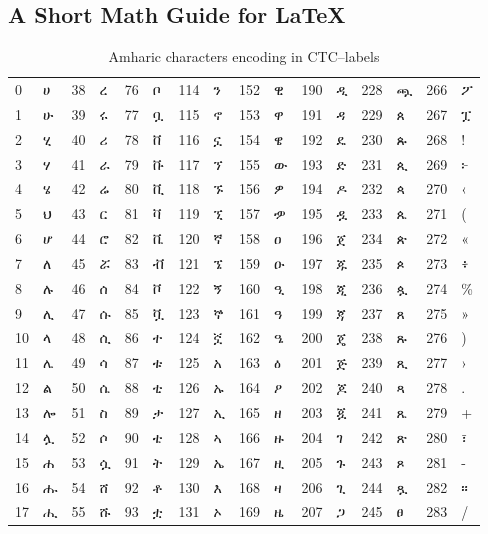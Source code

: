 \subsection{A Short Math Guide for \LaTeX{}}


\begin{table}[h!]
	\centering
	\caption{Amharic characters encoding in CTC--labels}
	{
		\begin{tabular}{|ll|ll|ll|ll|ll|ll|ll|ll|} 
			\hline
			0  & ሀ & 38 & ረ & 76  & ቦ & 114 & ን & 152 & ዊ & 190 & ዲ & 228 & ጯ & 266 & ፖ \\
			1  & ሁ & 39 & ሩ & 77  & ቧ & 115 & ኖ & 153 & ዋ & 191 & ዳ & 229 & ጰ & 267 & ፗ \\
			2  & ሂ & 40 & ሪ & 78  & ቨ & 116 & ኗ & 154 & ዌ & 192 & ዴ & 230 & ጱ & 268 & ! \\
			3  & ሃ & 41 & ራ & 79  & ቩ & 117 & ኘ & 155 & ው & 193 & ድ & 231 & ጲ & 269 & ፦ \\
			4  & ሄ & 42 & ሬ & 80  & ቪ & 118 & ኙ & 156 & ዎ & 194 & ዶ & 232 & ጳ & 270 & ‹ \\
			5  & ህ & 43 & ር & 81  & ቫ & 119 & ኚ & 157 & ዏ & 195 & ዷ & 233 & ጴ & 271 & ( \\
			6  & ሆ & 44 & ሮ & 82  & ቬ & 120 & ኛ & 158 & ዐ & 196 & ጀ & 234 & ጵ & 272 & « \\
			7  & ለ & 45 & ሯ & 83  & ቭ & 121 & ኜ & 159 & ዑ & 197 & ጁ & 235 & ጶ & 273 & ፥ \\
			8  & ሉ & 46 & ሰ & 84  & ቮ & 122 & ኝ & 160 & ዒ & 198 & ጂ & 236 & ጷ & 274 & \%                    \\
			9  & ሊ & 47 & ሱ & 85  & ቯ & 123 & ኞ & 161 & ዓ & 199 & ጃ & 237 & ጸ & 275 & » \\
			10 & ላ & 48 & ሲ & 86  & ተ & 124 & ኟ & 162 & ዔ & 200 & ጄ & 238 & ጹ & 276 & ) \\
			11 & ሌ & 49 & ሳ & 87  & ቱ & 125 & አ & 163 & ዕ & 201 & ጅ & 239 & ጺ & 277 & › \\
			12 & ል & 50 & ሴ & 88  & ቲ & 126 & ኡ & 164 & ዖ & 202 & ጆ & 240 & ጻ & 278 & . \\
			13 & ሎ & 51 & ስ & 89  & ታ & 127 & ኢ & 165 & ዘ & 203 & ጇ & 241 & ጼ & 279 & + \\
			14 & ሏ & 52 & ሶ & 90  & ቴ & 128 & ኣ & 166 & ዙ & 204 & ገ & 242 & ጽ & 280 & ፣ \\
			15 & ሐ & 53 & ሷ & 91  & ት & 129 & ኤ & 167 & ዚ & 205 & ጉ & 243 & ጾ & 281 & - \\
			16 & ሑ & 54 & ሸ & 92  & ቶ & 130 & እ & 168 & ዛ & 206 & ጊ & 244 & ጿ & 282 & ። \\
			17 & ሒ & 55 & ሹ & 93  & ቷ & 131 & ኦ & 169 & ዜ & 207 & ጋ & 245 & ፀ & 283 & / \\

\end{tabular}}
\end{table}
